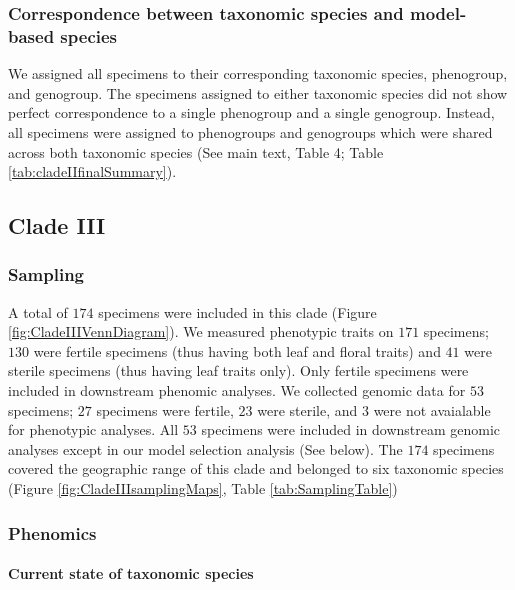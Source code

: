 \documentclass[
  11pt,
]{article}
\begin{document}
\hypertarget{correspondence-between-taxonomic-species-and-model-based-species-1}{%
\subsubsection{Correspondence between taxonomic species and model-based species}\label{correspondence-between-taxonomic-species-and-model-based-species-1}}

We assigned all specimens to their corresponding taxonomic species, phenogroup, and genogroup. The specimens assigned to either taxonomic species did not show perfect correspondence to a single phenogroup and a single genogroup. Instead, all specimens were assigned to phenogroups and genogroups which were shared across both taxonomic species (See main text, Table 4; Table \ref{tab:cladeIIfinalSummary}).

\hypertarget{clade-iii}{%
\subsection{Clade III}\label{clade-iii}}

\hypertarget{sampling-3}{%
\subsubsection{Sampling}\label{sampling-3}}

A total of \(174\) specimens were included in this clade (Figure \ref{fig:CladeIIIVennDiagram}). We measured phenotypic traits on \(171\) specimens; \(130\) were fertile specimens (thus having both leaf and floral traits) and \(41\) were sterile specimens (thus having leaf traits only). Only fertile specimens were included in downstream phenomic analyses. We collected genomic data for \(53\) specimens; \(27\) specimens were fertile, \(23\) were sterile, and \(3\) were not avaialable for phenotypic analyses. All \(53\) specimens were included in downstream genomic analyses except in our model selection analysis (See below). The \(174\) specimens covered the geographic range of this clade and belonged to six taxonomic species (Figure \ref{fig:CladeIIIsamplingMaps}, Table \ref{tab:SamplingTable})

\hypertarget{phenomics-3}{%
\subsubsection{Phenomics}\label{phenomics-3}}

\hypertarget{current-state-of-taxonomic-species-2}{%
\paragraph{Current state of taxonomic species}\label{current-state-of-taxonomic-species-2}}
\end{document}
